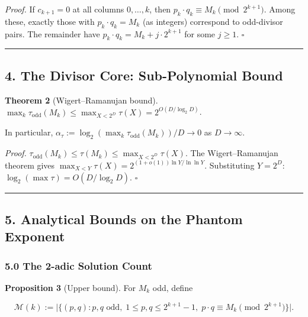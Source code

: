 \documentclass[
  11pt,
]{article}
\begin{document}
\emph{Proof.} If \(c_{k+1} = 0\) at all columns \(0, \ldots, k\), then
\(p_k \cdot q_k \equiv M_k \pmod{2^{k+1}}\). Among these, exactly those with
\(p_k \cdot q_k = M_k\) (as integers) correspond to odd-divisor pairs. The
remainder have \(p_k \cdot q_k = M_k + j \cdot 2^{k+1}\) for some \(j \geq 1\).
\(\square\)

\begin{center}\rule{0.5\linewidth}{0.5pt}\end{center}

\newpage

\subsection{4. The Divisor Core: Sub-Polynomial
Bound}\label{the-divisor-core-sub-polynomial-bound}

\textbf{Theorem 2} (Wigert--Ramanujan bound).
\(\max_k \tau_{\text{odd}}(M_k) \leq \max_{X < 2^D} \tau(X) = 2^{O(D / \log_2 D)}\).

In particular,
\(\alpha_\tau := \log_2(\max_k \tau_{\text{odd}}(M_k)) / D \to 0\) as
\(D \to \infty\).

\emph{Proof.}
\(\tau_{\text{odd}}(M_k) \leq \tau(M_k) \leq \max_{X < 2^D} \tau(X)\). The
Wigert--Ramanujan theorem gives
\(\max_{X < Y} \tau(X) = 2^{(1+o(1)) \ln Y / \ln \ln Y}\). Substituting
\(Y = 2^D\): \(\log_2(\max \tau) = O(D / \log_2 D)\). \(\square\)

\begin{center}\rule{0.5\linewidth}{0.5pt}\end{center}

\newpage

\subsection{5. Analytical Bounds on the Phantom
Exponent}\label{analytical-bounds-on-the-phantom-exponent}

\subsubsection{5.0 The 2-adic Solution Count}\label{the-2-adic-solution-count}

\textbf{Proposition 3} (Upper bound). For \(M_k\) odd, define

\[\mathcal{M}(k) := \lvert \lbrace{}(p,q) : p,q \text{ odd},\; 1 \leq p,q \leq 2^{k+1}-1,\; p \cdot q \equiv M_k \pmod{2^{k+1}} \rbrace{} \rvert.\]
\end{document}
